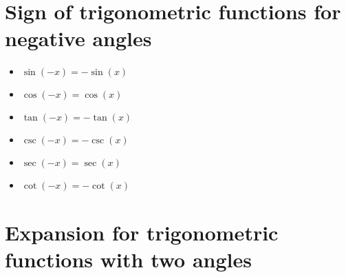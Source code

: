 \documentclass{article}
\begin{document}
\maketitle
\section{Sign of trigonometric functions for negative angles}

\begin{itemize}
\item $\sin(-x) = -\sin(x)$
\item $\cos(-x) = \cos(x)$
\item $\tan(-x) = -\tan(x)$
\item $\csc(-x) = -\csc(x)$
\item $\sec(-x) = \sec(x)$
\item $\cot(-x) = -\cot(x)$
\end{itemize}

\maketitle
\section{Expansion for trigonometric functions with two angles}
\end{document}

